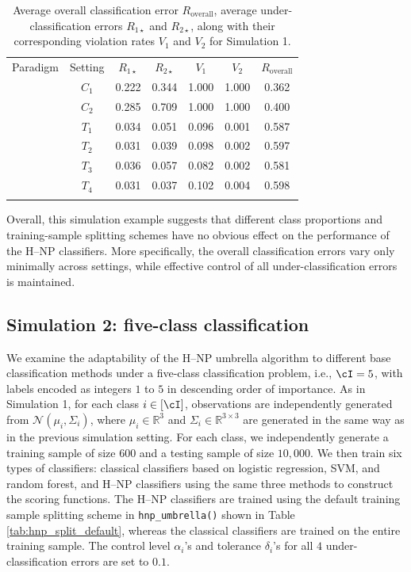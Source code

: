 \begin{table}[h!]
\centering

\begin{tabular}{c !{\vrule width 1.2pt} c !{\vrule width 1.2pt} c c !{\vrule width 1.2pt} c c !{\vrule width 1.2pt} c}
\Xhline{1.2pt}
Paradigm & Setting  & $R_{1\star}$ & $R_{2\star}$ & $V_1$ & $V_2$ & $R_{\text{overall}}$ \\
\Xhline{1.2pt}
 & $C_1$  & 0.222 & 0.344 & 1.000 & 1.000 & 0.362 \\
& $C_2$  & 0.285 & 0.709 & 1.000 & 1.000 & 0.400 \\
\Xhline{1.2pt}
 & $T_1$  & 0.034 & 0.051 & 0.096 & 0.001 & 0.587 \\
& $T_2$  & 0.031 & 0.039 & 0.098 & 0.002 & 0.597 \\
& $T_3$  & 0.036 & 0.057 & 0.082 & 0.002 & 0.581 \\
& $T_4$  & 0.031 & 0.037 & 0.102 & 0.004 & 0.598 \\


\Xhline{1.2pt}
\end{tabular}
\caption{Average overall classification error $R_{\text{overall}}$, average under-classification errors $R_{1\star}$ and $R_{2\star}$, along with their corresponding violation rates $V_1$ and $V_2$ for Simulation 1.}
\label{tab:sim3_results}
\end{table}




Overall, this simulation example suggests that different class proportions and training-sample splitting schemes have no obvious effect on the performance of the H--NP classifiers. More specifically, the overall classification errors vary only minimally across settings, while effective control of all under-classification errors is maintained.


\subsection{Simulation 2: five-class classification}

We examine the adaptability of the H--NP umbrella algorithm to different base
classification methods under a five-class classification problem, i.e.,
$\cI=5$, with labels encoded as integers $1$ to $5$ in descending order of
importance. As in Simulation 1, for each class $i \in [\cI]$, observations are
independently generated from $\mathcal{N}(\mu_i,\Sigma_i)$, where
$\mu_i \in \mathbb{R}^3$ and $\Sigma_i \in \mathbb{R}^{3 \times 3}$ are
generated in the same way as in the previous simulation setting. For each
class, we independently generate a training sample of size $600$ and a testing
sample of size $10{,}000$.  We then train six types of classifiers: classical
classifiers based on logistic regression, SVM, and random forest, and H--NP
classifiers using the same three methods to construct the scoring functions. The H--NP classifiers are trained using the default training sample splitting scheme in \texttt{hnp\_umbrella()} shown in Table \ref{tab:hnp_split_default}, whereas the classical classifiers are trained on the entire training sample. The control level $\alpha_i$'s and tolerance $\delta_i$'s for all $4$ under-classification errors are set to $0.1$. 


